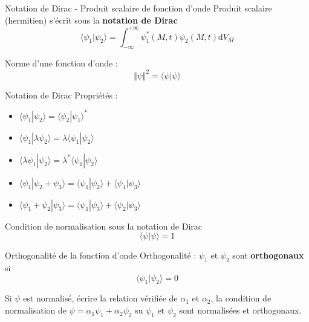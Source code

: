 
\begin{Definition}[colbacktitle=red!75!black]{Notation de Dirac - Produit scalaire de fonction d'onde}{}
Produit scalaire (hermitien) s'écrit sous la \textbf{notation de Dirac}
\[
  \boxed{  \langle \psi_1 | \psi_2 \rangle = \int _{- \infty} ^{+ \infty} \psi_1^{*}(M,t) \psi_2(M,t) \mathrm{d} V_M}
\]

Norme d'une fonction d'onde : 
\[
\Vert \psi  \Vert ^{2}  = \langle \psi | \psi \rangle
\]
\end{Definition}

\begin{Prop}{Notation de Dirac}{}
Propriétés :
\begin{itemize}
    \item $\langle \psi_1 | \psi_2 \rangle = \langle \psi_2 | \psi_1 \rangle ^{*}$
    \item $\langle \psi_1 | \lambda \psi_2 \rangle = \lambda \langle \psi_1 | \psi_2 \rangle $ 
    \item $\langle \lambda \psi_1 | \psi_2 \rangle = \lambda^{*} \langle \psi_1 | \psi_2 \rangle $
    \item $\langle \psi_1 | \psi_2 + \psi_3 \rangle = \langle \psi_1 | \psi_2 \rangle + \langle \psi_1 | \psi_3 \rangle$
    \item $\langle \psi_1 + \psi_2 | \psi_3 \rangle = \langle \psi_1 | \psi_3 \rangle + \langle \psi_2 | \psi_3 \rangle$
\end{itemize}
\end{Prop}

\begin{Prop}{Condition de normalisation sous la notation de Dirac}{}
  $$\boxed{\langle \psi | \psi \rangle =1}$$
\end{Prop}
\begin{Definition}[colbacktitle=red!75!black]{Orthogonalité de la fonction d'onde}{}
  Orthogonalité : $\psi_1$ et $\psi_2$ sont \textbf{orthogonaux} si $$\boxed{\langle \psi_1 | \psi_2 \rangle =0}$$
\end{Definition}




\begin{question}{}{}
Si $\psi$ est normalisé, écrire la relation vérifiée de $\alpha_1$ et $\alpha_2$, la condition de normalisation de $\psi = \alpha _1\psi_1 + \alpha _2 \psi_2$ su $\psi_1$ et $\psi_2$ sont normalisées et orthogonaux.
\end{question}

